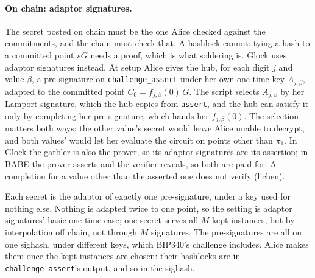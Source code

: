 \documentclass[11pt]{article}
\newcommand{\tx}[1]{\texttt{#1}}
\begin{document}
\paragraph{On chain: adaptor signatures.} The secret posted on chain
must be the one Alice checked against the commitments, and the chain
must check that. A hashlock cannot: tying a hash to a committed point
$s G$ needs a proof, which is what soldering is. Glock uses adaptor
signatures instead. At setup Alice gives the hub, for each digit $j$ and
value $\beta$, a pre-signature on \tx{challenge\_assert} under her own
one-time key $A_{j,\beta}$, adapted to the committed point $C_0 =
f_{j,\beta}(0)\,G$. The script selects $A_{j,\beta}$ by her Lamport
signature, which the hub copies from \tx{assert}, and the hub can
satisfy it only by completing her pre-signature, which hands her
$f_{j,\beta}(0)$. The selection matters both ways: the other value's
secret would leave Alice unable to decrypt, and both values' would let
her evaluate the circuit on points other than $\pi_1$. In Glock the
garbler is also the prover, so its adaptor signatures are its
assertion; in BABE the prover asserts and the verifier reveals, so both
are paid for. A completion for a value other than the asserted one does
not verify (lichen).

Each secret is the adaptor of exactly one pre-signature, under a key
used for nothing else. Nothing is adapted twice to one point, so the
setting is adaptor signatures' basic one-time case; one secret serves
all $M$ kept instances, but by interpolation off chain, not through
$M$ signatures. The pre-signatures are all on one sighash, under
different keys, which BIP340's challenge includes. Alice makes them
once the kept instances are chosen: their hashlocks are in
\tx{challenge\_assert}'s output, and so in the sighash.
\end{document}
